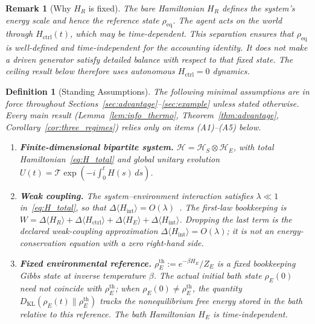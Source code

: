 \documentclass[12pt]{article}
\newtheorem{definition}[theorem]{Definition}
\newtheorem{remark}[theorem]{Remark}
\begin{document}
\begin{remark}[Why $H_R$ is fixed]
\label{rem:H_fixed}
The bare Hamiltonian $H_R$ defines the system's energy scale and
hence the reference state $\rho_{\mathrm{eq}}$.
The agent acts on the world through $H_{\mathrm{ctrl}}(t)$,
which may be time-dependent.
This separation ensures that $\rho_{\mathrm{eq}}$ is
well-defined and time-independent for the accounting identity.
It does \emph{not} make a driven generator satisfy detailed balance
with respect to that fixed state.  The ceiling result below therefore
uses autonomous $H_{\mathrm{ctrl}}=0$ dynamics.
\end{remark}

\begin{definition}[Standing Assumptions]
\label{def:assumptions}
The following minimal assumptions are in force throughout
Sections~\ref{sec:advantage}--\ref{sec:example} unless
stated otherwise.
Every main result
(Lemma~\ref{lem:info_thermo},
Theorem~\ref{thm:advantage},
Corollary~\ref{cor:three_regimes})
relies \emph{only} on items
\textup{(A1)--(A5)} below.
\begin{enumerate}
\item[\textup{(A1)}]
  \textbf{Finite-dimensional bipartite system.}
  $\mathcal{H} = \mathcal{H}_S \otimes \mathcal{H}_E$,
  with total Hamiltonian~\eqref{eq:H_total}
  and global unitary evolution
  $U(t) = \mathcal{T}\exp(-i\int_0^t H(s)\,ds)$.

\item[\textup{(A2)}]
  \textbf{Weak coupling.}
  The system--environment interaction satisfies
  $\lambda \ll 1$ in~\eqref{eq:H_total}, so that
  $\Delta\langle H_{\mathrm{int}} \rangle
  = O(\lambda)$~\cite{BreuerPetruccione2002}.
  The first-law bookkeeping is
  $W=\Delta\langle H_R\rangle
  + \Delta\langle H_{\mathrm{ctrl}}\rangle
  + \Delta\langle H_E\rangle
  + \Delta\langle H_{\mathrm{int}}\rangle$.
  Dropping the last term is the declared weak-coupling approximation
  $\Delta\langle H_{\mathrm{int}}\rangle=O(\lambda)$; it is not
  an energy-conservation equation with a zero right-hand side.

\item[\textup{(A3)}]
  \textbf{Fixed environmental reference.}
  $\rho_E^{\mathrm{th}} := e^{-\beta H_E}/Z_E$
  is a fixed \emph{bookkeeping} Gibbs state at inverse
  temperature $\beta$.
  The \emph{actual} initial bath state $\rho_E(0)$
  need not coincide with $\rho_E^{\mathrm{th}}$;
  when $\rho_E(0) \neq \rho_E^{\mathrm{th}}$, the quantity
  $D_{\mathrm{KL}}(\rho_E(t)\|\rho_E^{\mathrm{th}})$
  tracks the nonequilibrium free energy stored in the bath
  relative to this reference.
  The bath Hamiltonian $H_E$ is time-independent.


\end{enumerate}
\end{definition}
\end{document}
